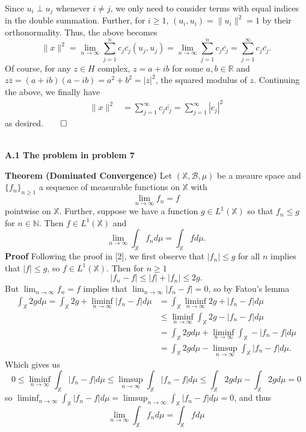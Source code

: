\documentclass[11pt, letterpaper]{article}
\newcommand{\mbb}[1]{\mathbb{#1}}
\newcommand{\mc}[1]{\mathcal{#1}}
\begin{document}
    Since $u_i\perp u_j$ whenever $i\neq j$, we only need to consider terms with equal indices in the double summation. Further, for $i\geq 1$, $(u_i,u_i)=\|u_i\|^2=1$ by their orthonormality. Thus, the above becomes
    \[\|x\|^2=\lim_{n\rightarrow\infty}\sum_{j=1}^n c_j\overline{c_j}(u_j,u_j)=\lim_{n\rightarrow\infty}\sum_{j=1}^n c_j\overline{c_j}=\sum_{j=1}^\infty c_j\overline{c_j}.\]
    Of course, for any $z\in H$ complex, $z=a+ib$ for some $a,b\in\mbb{R}$ and $z\overline{z}=(a+ib)(a-ib)=a^2+b^2=|z|^2$, the squared modulus of $z$. Continuing the above, we finally have
    \begin{align*}
        \|x\|^2&=\sum_{j=1}^\infty c_j\overline{c_j}
        =\sum_{j=1}^\infty|c_j|^2
    \end{align*}
    as desired.\hfill{$\qed$}


    \newpage
    \\[10pt]
    {\bf A.1 The problem in problem 7}
    \begin{center}
        \begin{minipage}[c]{0.85\linewidth}
            {\bf Theorem (Dominated Convergence)} Let $(\mbb{X},\mc{B},\mu)$ be a meaure space and $\{f_n\}_{n\geq 1}$ a sequence of measurable functions on $\mbb{X}$ with 
            \[\lim_{n\rightarrow\infty}f_n=f\]
            pointwise on $\mbb{X}$. Further, suppose we have a function $g\in L^1(\mbb{X})$ so that $f_n\leq g$ for $n\in\mbb{N}$. Then $f\in L^1(\mbb{X})$ and
            \[\lim_{n\rightarrow\infty}\int_{\mbb{X}}f_nd\mu=\int_{\mbb{X}}fd\mu.\]
            {\bf Proof} Following the proof in [2], we first observe that $|f_n|\leq g$ for all $n$ implies that $|f|\leq g$, so $f\in L^1(\mbb{X})$. Then for $n\geq 1$
            \[|f_n-f|\leq|f|+|f_n|\leq 2g.\]
            But $\lim_{n\rightarrow\infty}f_n=f$ implies that $\lim_{n\rightarrow\infty}|f_n-f|=0$, so by Fatou's lemma
            \begin{align*}
                \int_\mbb{X}2gd\mu=\int_\mbb{X}2g+\liminf_{n\rightarrow\infty}|f_n-f|d\mu&=\int_\mbb{X}\liminf_{n\rightarrow\infty}2g+|f_n-f|d\mu\\
                &\leq\liminf_{n\rightarrow\infty}\int_{\mbb{X}}2g-|f_n-f|d\mu\tag{Fatou's lemma}\\
                &=\int_{\mbb{X}}2gd\mu+\liminf_{n\rightarrow\infty}\int_\mbb{X}-|f_n-f|d\mu\\
                &=\int_{\mbb{X}}2gd\mu-\limsup_{n\rightarrow\infty}\int_\mbb{X}|f_n-f|d\mu.
            \end{align*}
            Which gives us
            \[0\leq\liminf_{n\rightarrow\infty}\int_\mbb{X}|f_n-f|d\mu\leq\limsup_{n\rightarrow\infty}\int_\mbb{X}|f_n-f|d\mu\leq\int_\mbb{X}2gd\mu-\int_\mbb{X}2gd\mu=0\tag{$\ast$}\]
            so $\liminf_{n\rightarrow\infty}\int_\mbb{X}|f_n-f|d\mu=\limsup_{n\rightarrow\infty}\int_\mbb{X}|f_n-f|d\mu=0$, and thus
            \[\lim_{n\rightarrow\infty}\int_\mbb{X}f_nd\mu=\int_{\mbb{X}}fd\mu\tag*{$\qed$}\]
        \end{minipage}
    \end{center}\vspace{10pt}
\end{document}
